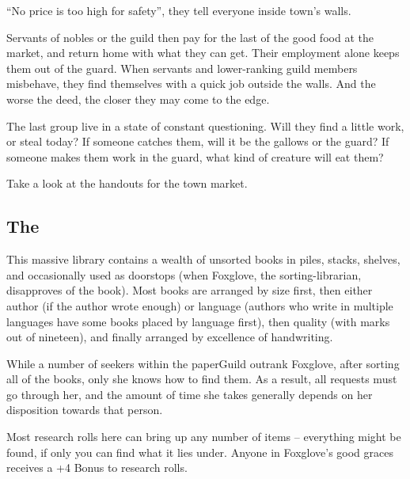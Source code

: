 ``No price is too high for safety'', they tell everyone inside \gls{town}'s walls.

Servants of nobles or the guild then pay for the last of the good food at the market, and return home with what they can get.
Their employment alone keeps them out of the \gls{guard}.
When servants and lower-ranking guild members misbehave, they find themselves with a quick job outside the walls.
And the worse the deed, the closer they may come to the \gls{edge}.

The last group live in a state of constant questioning.
Will they find a little work, or steal today?
If someone catches them, will it be the gallows or the guard?
If someone makes them work in the \gls{guard}, what kind of creature will eat them?

Take a look at the handouts for the \gls{town} market.

\subsection{The }
\label{paperGuild}

This massive library contains a wealth of unsorted books in piles, stacks, shelves, and occasionally used as doorstops (when Foxglove, the sorting-librarian, disapproves of the book).
Most books are arranged by size first, then either author (if the author wrote enough) or language (authors who write in multiple languages have some books placed by language first), then quality (with marks out of nineteen), and finally arranged by excellence of handwriting.


While a number of \glspl{seeker} within the \gls{paperGuild} outrank Foxglove, after sorting all of the books, only she knows how to find them.
As a result, all requests must go through her, and the amount of time she takes generally depends on her disposition towards that person.

Most research rolls here can bring up any number of items -- everything might be found, if only you can find what it lies under.
Anyone in Foxglove's good graces receives a +4 Bonus to research rolls.

